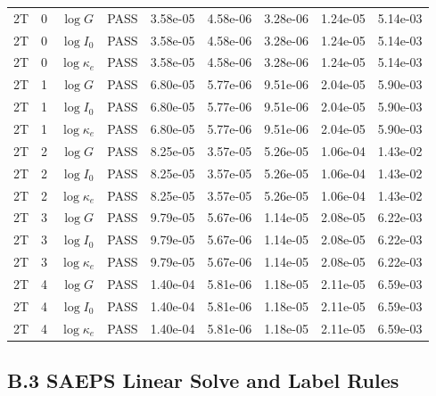\documentclass[preprint,12pt]{elsarticle}
\begin{document}
\begin{landscape}
\begin{longtable}{llclrrrrr}
2T & 0 & $\log G$ & PASS & 3.58e-05 & 4.58e-06 & 3.28e-06 & 1.24e-05 & 5.14e-03 \\
2T & 0 & $\log I_0$ & PASS & 3.58e-05 & 4.58e-06 & 3.28e-06 & 1.24e-05 & 5.14e-03 \\
2T & 0 & $\log\kappa_e$ & PASS & 3.58e-05 & 4.58e-06 & 3.28e-06 & 1.24e-05 & 5.14e-03 \\
2T & 1 & $\log G$ & PASS & 6.80e-05 & 5.77e-06 & 9.51e-06 & 2.04e-05 & 5.90e-03 \\
2T & 1 & $\log I_0$ & PASS & 6.80e-05 & 5.77e-06 & 9.51e-06 & 2.04e-05 & 5.90e-03 \\
2T & 1 & $\log\kappa_e$ & PASS & 6.80e-05 & 5.77e-06 & 9.51e-06 & 2.04e-05 & 5.90e-03 \\
2T & 2 & $\log G$ & PASS & 8.25e-05 & 3.57e-05 & 5.26e-05 & 1.06e-04 & 1.43e-02 \\
2T & 2 & $\log I_0$ & PASS & 8.25e-05 & 3.57e-05 & 5.26e-05 & 1.06e-04 & 1.43e-02 \\
2T & 2 & $\log\kappa_e$ & PASS & 8.25e-05 & 3.57e-05 & 5.26e-05 & 1.06e-04 & 1.43e-02 \\
2T & 3 & $\log G$ & PASS & 9.79e-05 & 5.67e-06 & 1.14e-05 & 2.08e-05 & 6.22e-03 \\
2T & 3 & $\log I_0$ & PASS & 9.79e-05 & 5.67e-06 & 1.14e-05 & 2.08e-05 & 6.22e-03 \\
2T & 3 & $\log\kappa_e$ & PASS & 9.79e-05 & 5.67e-06 & 1.14e-05 & 2.08e-05 & 6.22e-03 \\
2T & 4 & $\log G$ & PASS & 1.40e-04 & 5.81e-06 & 1.18e-05 & 2.11e-05 & 6.59e-03 \\
2T & 4 & $\log I_0$ & PASS & 1.40e-04 & 5.81e-06 & 1.18e-05 & 2.11e-05 & 6.59e-03 \\
2T & 4 & $\log\kappa_e$ & PASS & 1.40e-04 & 5.81e-06 & 1.18e-05 & 2.11e-05 & 6.59e-03 \\
\bottomrule
\end{longtable}
\endgroup
\end{landscape}

\subsection*{B.3 SAEPS Linear Solve and Label Rules}
\end{document}
